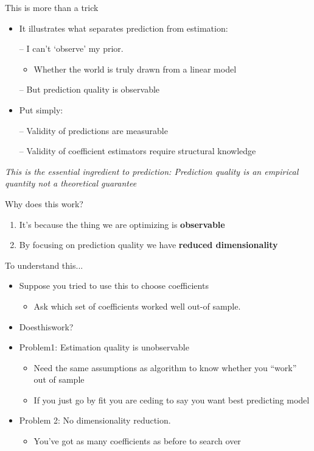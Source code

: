 \documentclass{beamer}
\begin{document}
\begin{frame}{This is more than a trick}
	\begin{itemize}
		\item It illustrates what separates prediction from estimation:
		
		– I can’t ‘observe’ my prior.
		\begin{itemize}
			\item Whether the world is truly drawn from a linear model
		\end{itemize}
		
		– But prediction quality is observable
		\item Put simply:
		
		– Validity of predictions are measurable
		
		– Validity of coefficient estimators require structural knowledge
	\end{itemize}
	\textit{This is the essential ingredient to prediction: Prediction quality is an empirical quantity not a theoretical guarantee}
\end{frame}

\begin{frame}{Why does this work?}	
	\begin{enumerate}
		\item It’s because the thing we are optimizing is \textbf{observable} \vspace*{0.5cm}
		\item By focusing on prediction quality we have \textbf{reduced dimensionality}
	\end{enumerate}
\end{frame}

\begin{frame}{To understand this...}
	\begin{itemize}
		\item Suppose you tried to use this to choose coefficients
		\begin{itemize}
			\item Ask which set of coefficients worked well out-of sample.
		\end{itemize}
		\item Doesthiswork?
		\item Problem1: Estimation quality is unobservable
		\begin{itemize}
			\item Need the same assumptions as algorithm to know whether you “work” out of sample
			\item If you just go by fit you are ceding to say you want best predicting model
		\end{itemize}
		\item Problem 2: No dimensionality reduction.
		\begin{itemize}
			\item You’ve got as many coefficients as before to search over
		\end{itemize}
	\end{itemize}
\end{frame}
\end{document}
